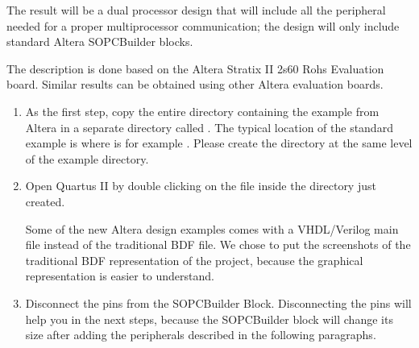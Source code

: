 
The result will be a dual processor design
that will include all the peripheral needed for a proper
multiprocessor communication; the design will only include standard
Altera SOPCBuilder blocks.

The description is done based on the Altera Stratix II 2s60 Rohs
Evaluation board. Similar results can be obtained using other Altera
evaluation boards.

\begin{enumerate}
\item As the first step, copy the entire directory containing the
   example from Altera in a separate directory called
  . The typical location of the standard example
  is
  where  is for example
  . Please create the directory
   at the same level of the 
  example directory.



\item Open Quartus II by double clicking on the 
  file inside the  directory just created.

\begin{note}
  Some of the new Altera design examples comes with a VHDL/Verilog
  main file instead of the traditional BDF file. We chose to put the
  screenshots of the traditional BDF representation of the project,
  because the graphical representation is easier to understand.
\end{note}



\item Disconnect the pins from the SOPCBuilder Block. Disconnecting the pins
  will help you in the next steps, because the SOPCBuilder block will
  change its size after adding the peripherals described in the
  following paragraphs.



\end{enumerate}
